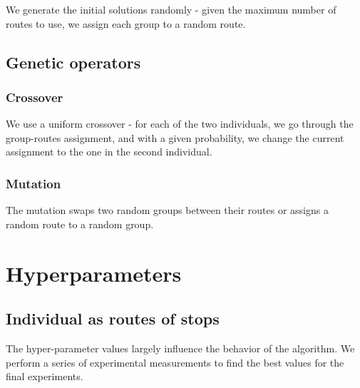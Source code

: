 We generate the initial solutions randomly - given the maximum number of routes to use, we assign each group to a random route.

\subsection{Genetic operators}

\subsubsection{Crossover}

We use a uniform crossover - for each of the two individuals, we go through the group-routes assignment, and with a given probability, we change the current assignment to the one in the second individual.

\subsubsection{Mutation}

The mutation swaps two random groups between their routes or assigns a random route to a random group.

\section{Hyperparameters}\label{sec:genetic_hyperparams}

\subsection{Individual as routes of stops}

The hyper-parameter values largely influence the behavior of the algorithm. We perform a series of experimental measurements to find the best values for the final experiments.

